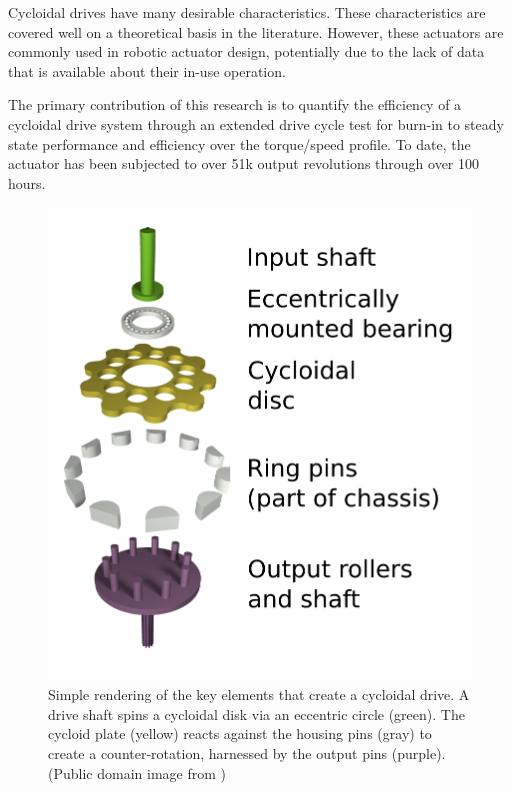 Cycloidal drives have many desirable characteristics. These characteristics are covered well on a theoretical basis in the literature. However, these actuators are commonly used in robotic actuator design, potentially due to the lack of data that is available about their in-use operation.

The primary contribution of this research is to quantify the efficiency of a cycloidal drive system through an extended drive cycle test for burn-in to steady state performance and efficiency over the torque/speed profile.
To date, the actuator has been subjected to over 51k output revolutions through over 100 hours.

\begin{figure}[!b]
   \centering
   \includegraphics[width=0.60\linewidth]{images/Cycloidal_drive_parts}
    \caption{Simple rendering of the key elements that create a cycloidal drive.
   	A drive shaft spins a cycloidal disk via an eccentric circle (green).
   	The cycloid plate (yellow) reacts against the housing pins (gray) to create a counter-rotation, harnessed by the output pins (purple). (Public domain image from \cite{cycloid_cartoon})}
   \label{cycloid_cartoon}
\end{figure}



